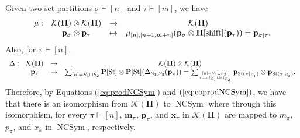 \documentclass[12pt]{amsart}  %
\theoremstyle{definition}
\theoremstyle{remark}
\numberwithin{equation}{section}
\newcommand{\NCSym}{\ensuremath{\operatorname{NCSym}}}
\newcommand{\mnc}{{m}}           	%
\newcommand{\pnc}{{p}}                %
\newcommand{\xnc}{{x}}                 %
\newcommand{\mhm}{\mathbf{m}}           	%
\newcommand{\phm}{\mathbf{p}}                %
\newcommand{\xhm}{\mathbf{x}}
\newcommand{\bP}{{\mathbf{P}}}
\newcommand{\bPi}{{\mathbf{\Pi}}}
\newcommand{\calK}{{\mathcal{K}}}
\newcommand{\St}{{\mathrm{St}}}
\newcommand\svw[1]{{\color{black}{#1}}}
\begin{document}
Given two set partitions $\sigma\vdash [n]$ and $\tau\vdash [m]$, we have
\begin{equation}\label{eq:SetProduct}
\begin{array}{cccc}
\mu: & \calK(\bPi)\otimes  \calK(\bPi)&  \rightarrow & \calK(\bPi)\\
& \phm_\sigma\otimes \phm_\tau & \mapsto & \mu_{[n],[n+1,m+n]}(\phm_\sigma \otimes \bPi[{\rm shift}]( \phm_\tau))=\phm_{\sigma|\tau}.
\end{array} 
\end{equation}
Also, for $\pi\vdash [n]$, 
\begin{equation}\label{eq:SetCoproduct}
\scriptstyle{
\begin{array}{cccc}
\Delta: & \calK(\svw{\bPi})&  \rightarrow & \calK(\svw{\bPi})\otimes  \calK(\svw{\bPi})\\
& \phm_\pi & \mapsto & \sum_{[n]= S_1\sqcup S_2}\bP[\St]\otimes \bP[\St](\Delta_{S_1,S_2}(\phm_\pi))=\sum_{[n]=S_1\sqcup S_2:\atop {\pi=\pi|_{S_1}\sqcup \pi|_{S_2}}}\phm_{\St(\pi|_{S_1})}\otimes \phm_{\St(\pi|_{S_2})}.
\end{array} 
}
\end{equation}
Therefore, by Equations (\ref{eq:prodNCSym}) and $(\ref{eq:coprodNCSym})$, we have that there is an isomorphism from  $ \calK(\bPi)$ to $\NCSym$  where through this isomorphism, for every $\pi\vdash [n]$, $\mhm_\pi$, $\phm_\pi$, and $\xhm_\pi$ in $\calK(\bPi)$ are mapped to  $\mnc_\pi$, $\pnc_\pi$, and $\xnc_\pi$ in $\NCSym$, respectively.  
\end{document}
